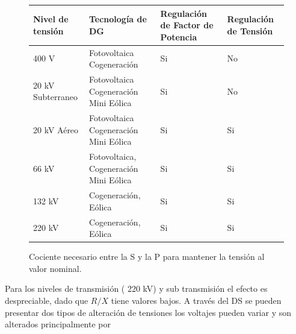 \documentclass[12pt, letterpaper]{report}
\begin{document}
\begin{figure}[H]
    \caption{Cociente necesario entre la S y la P para mantener la tensión al valor nominal. }
    \label{fig:s-p}
    \centering
    \vspace{3cm}
    \begin{tabular}{| p{3cm} |p{5cm}|>{\centering\arraybackslash} p{3cm}|>{\centering\arraybackslash} p{3cm}|}
        \hline
        Nivel de tensión & Tecnología de DG & Regulación de Factor de Potencia & Regulación de Tensión \\\hline
        400 V & Fotovoltaica Cogeneración&Si&No\\\hline
        20 kV Subterraneo & Fotovoltaica Cogeneración Mini Eólica &Si&No \\\hline
        20 kV Aéreo & Fotovoltaica Cogeneración Mini Eólica &Si&Si \\\hline
        66 kV  & Fotovoltaica, Cogeneración Mini Eólica &Si&Si \\\hline
        132 kV & Cogeneración, Eólica &Si&Si \\\hline
        220 kV & Cogeneración, Eólica &Si&Si \\\hline
    \end{tabular}
\end{figure}
Para los niveles de transmisión ( 220 kV) y sub transmisión  el efecto es despreciable, dado que $R/X$ tiene valores bajos. 
A través  del DS se pueden presentar dos tipos de alteración de tensiones los voltajes pueden variar y son alterados principalmente  por  
\end{document}

